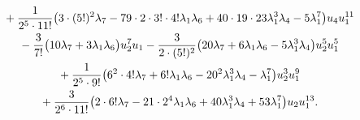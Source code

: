 \documentclass[pdftex]{sigma}
\numberwithin{equation}{section}
\begin{document}
\begin{gather*}
 \hphantom{S_{15} =}{} + \frac{1}{2^5 \cdot 11!} \big(3\cdot (5!)^2 \lambda_7 - 79 \cdot 2 \cdot 3! \cdot 4! \lambda_1\lambda_6
 + 40 \cdot 19\cdot 23 \lambda_1^3 \lambda_4 - 5 \lambda_1^7 \big) u_4 u_1^{11} \\
 \hphantom{S_{15} =}{} - \frac{3}{7!}\big(10\lambda_7 + 3 \lambda_1\lambda_6 \big) u_2^7 u_1 - \frac{3}{2\cdot (5!)^2} \big(20\lambda_7 + 6 \lambda_1\lambda_6 - 5 \lambda_1^3 \lambda_4 \big) u_2^5 u_1^5 \\
 \hphantom{S_{15} =}{} + \frac{1}{2^5\cdot 9!} \big(6^2 \cdot 4! \lambda_7 + 6! \lambda_1\lambda_6 - 20^2 \lambda_1^3 \lambda_4 - \lambda_1^7 \big) u_2^3 u_1^9\\
 \hphantom{S_{15} =}{} + \frac{3}{2^6\cdot 11!} \big(2\cdot 6! \lambda_7 - 21 \cdot 2^4 \lambda_1\lambda_6 + 40 \lambda_1^3 \lambda_4 + 53\lambda_1^7 \big) u_2 u_1^{13}.
\end{gather*}
\end{document}
